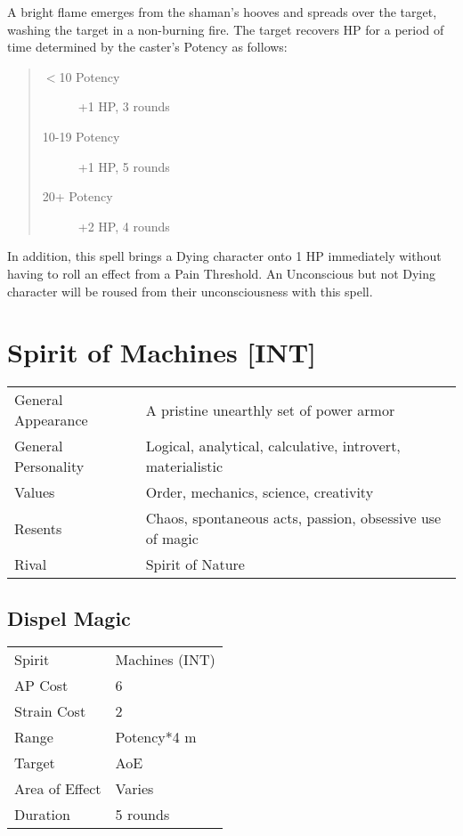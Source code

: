 \documentclass[11pt,a4paper,twocolumn]{book}
\begin{document}
\medskip

A bright flame emerges from the shaman's hooves and spreads over the target, washing the target in a non-burning fire. The target recovers HP for a period of time determined by the caster's Potency as follows:

\begin{quote}
	\begin{description}
		\item[$<$10 Potency] 	+1 HP, 3 rounds
		\item[10-19 Potency] 	+1 HP, 5 rounds
		\item[20+ Potency] 		+2 HP, 4 rounds
	\end{description}	
\end{quote}

In addition, this spell brings a Dying character onto 1 HP immediately without having to roll an effect from a Pain Threshold. An Unconscious but not Dying character will be roused from their unconsciousness with this spell.

\newpage

\section*{Spirit of Machines [INT]}
{
	\begin{tabu} to 75mm{| X[l,4] | X[l,8] |}
		\hline
		General Appearance  & A pristine unearthly set of power armor                    \\
		General Personality & Logical, analytical, calculative, introvert, materialistic \\
		Values              & Order, mechanics, science, creativity                      \\
		Resents             & Chaos, spontaneous acts, passion, obsessive use of magic   \\
		Rival               & Spirit of Nature                                           \\ \hline
	\end{tabu}
	
}

\medskip

\subsection*{Dispel Magic}
{
	\begin{tabu} to 75mm{| X[l,4] | X[l,7] |}
		\hline
		Spirit         & Machines (INT) \\
		AP Cost        & 6              \\
		Strain Cost    & 2              \\
		Range          & Potency*4 m    \\
		Target         & AoE            \\
		Area of Effect & Varies         \\
		Duration       & 5 rounds       \\ \hline
	\end{tabu}
	
}
\end{document}
